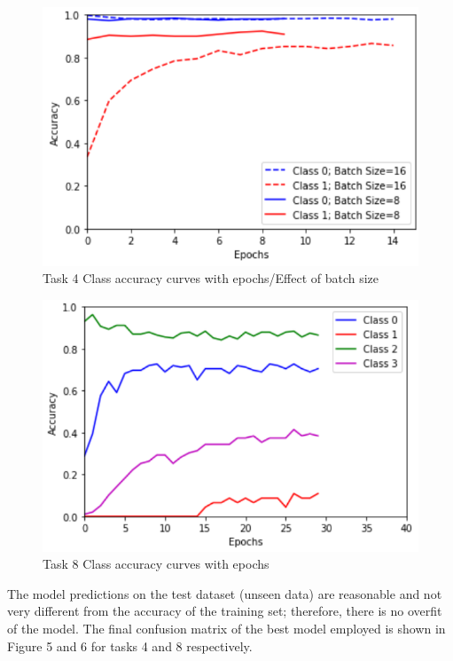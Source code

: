 \documentclass[10pt,twocolumn,letterpaper]{article}
\begin{document}
 \begin{figure}[t]
\begin{center}
   \includegraphics[width=0.8\linewidth]{task4Curves}
\end{center}
   \caption{Task 4 Class accuracy curves with epochs/Effect of batch size}
\label{fig:long3}
\end{figure}

\begin{figure}[t]
\begin{center}
   \includegraphics[width=0.8\linewidth]{task8Curves}
\end{center}
   \caption{Task 8 Class accuracy curves with epochs}
\label{fig:long4}
\end{figure}

The model predictions on the test dataset (unseen data) are reasonable and not very different from the accuracy of the training set; therefore, there is no overfit of the model. The final confusion matrix of the best model employed is shown in Figure 5 and 6 for tasks 4 and 8 respectively.
\end{document}
